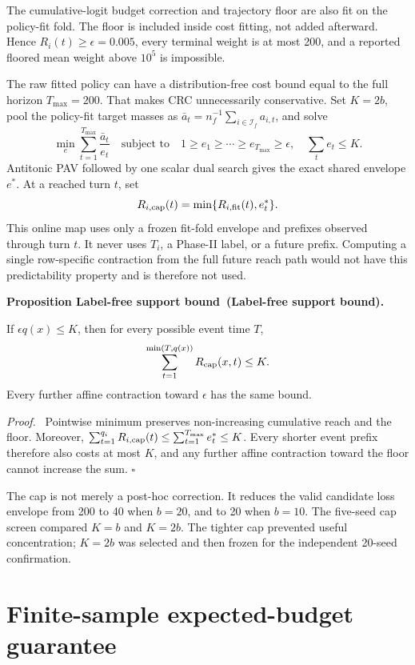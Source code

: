 \documentclass[10pt]{article}
\newcounter{proposition}
\newenvironment{proposition}[1][]{%
  \refstepcounter{proposition}\par\medskip\noindent
  \textbf{Proposition \theproposition\ifx\relax#1\relax\else\ (#1)\fi.}\ \itshape
}{\par\medskip}
\newenvironment{proof}{\par\noindent\textit{Proof.}\ }{\hfill$\square$\par}
\begin{document}
The cumulative-logit budget correction and trajectory floor are also fit on
the policy-fit fold.  The floor is included inside cost fitting, not added
afterward.  Hence $R_i(t)\ge\epsilon=0.005$, every terminal weight is at most
200, and a reported floored mean weight above $10^5$ is impossible.

The raw fitted policy can have a distribution-free cost bound equal to the
full horizon $T_{\max}=200$.  That makes CRC unnecessarily conservative.  Set
$K=2b$, pool the policy-fit target masses as
$\bar a_t=n_f^{-1}\sum_{i\in\mathcal I_f}a_{i,t}$, and solve
\[
\min_e\sum_{t=1}^{T_{\max}}\frac{\bar a_t}{e_t}
\quad\text{subject to}\quad
1\ge e_1\ge\cdots\ge e_{T_{\max}}\ge\epsilon,
\quad \sum_te_t\le K.
\]
Antitonic PAV followed by one scalar dual search gives the exact shared
envelope $e^*$.  At a reached turn $t$, set
\[
R_{i,\rm cap}(t)=\min\{R_{i,\rm fit}(t),e_t^*\}.
\]
This online map uses only a frozen fit-fold envelope and prefixes observed
through turn $t$.  It never uses $T_i$, a Phase-II label, or a future prefix.
Computing a single row-specific contraction from the full future reach path
would not have this predictability property and is therefore not used.

\begin{proposition}[Label-free support bound]
If $\epsilon q(x)\le K$, then for every possible event time $T$,
\[
\sum_{t=1}^{\min(T,q(x))}R_{\rm cap}(x,t)\le K.
\]
Every further affine contraction toward $\epsilon$ has the same bound.
\end{proposition}

\begin{proof}
Pointwise minimum preserves non-increasing cumulative reach and the floor.
Moreover,
$\sum_{t=1}^{q_i}R_{i,\rm cap}(t)\le\sum_{t=1}^{T_{\max}}e_t^*\le K$.
Every shorter event prefix therefore also costs at most $K$, and any further
affine contraction toward the floor cannot increase the sum.
\end{proof}

The cap is not merely a post-hoc correction.  It reduces the valid candidate
loss envelope from 200 to 40 when $b=20$, and to 20 when $b=10$.  The five-seed
cap screen compared $K=b$ and $K=2b$.  The tighter cap prevented useful
concentration; $K=2b$ was selected and then frozen for the independent
20-seed confirmation.

\section{Finite-sample expected-budget guarantee}
\end{document}
